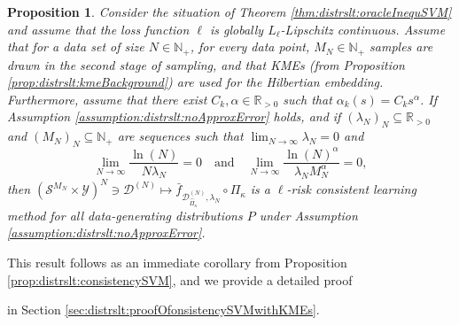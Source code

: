 \documentclass[letterpaper]{article} %
\newcommand{\R}{\mathbb{R}}
\newcommand{\Rp}{\R_{> 0}}
\newcommand{\Np}{\mathbb{N}_+}
\newcommand{\KME}[1]{\Pi_{#1}} %
\newcommand{\samplingSet}{\mathcal{S}} %
\newcommand{\outputSet}{\mathcal{Y}} %
\newcommand{\dataSet}{\mathcal{D}}
\newcommand{\kKME}{\kappa} %
\newcommand{\KMEk}{\KME{\kKME}} %
\newcommand{\KMEhat}{\hat{\Pi}_\kKME} %
\newcommand{\clipped}[1]{\bar{#1}}
\newtheorem{proposition}[theorem]{Proposition}
\newif\ifCameraReady
\begin{document}
\begin{proposition} \label{prop:distrslt:consistencySVMwithKMEs}
Consider the situation of Theorem \ref{thm:distrslt:oracleInequSVM} and assume that the loss function $\ell$ is globally $L_\ell$-Lipschitz continuous.
Assume that for a data set of size $N\in\Np$, for every data point, $M_N\in\Np$ samples are drawn in the second stage of sampling, and that KMEs (from Proposition \ref{prop:distrslt:kmeBackground}) are used for the Hilbertian embedding.
Furthermore, assume that there exist $C_k,\alpha\in\Rp$ such that $\alpha_k(s)=C_k s^\alpha$.
If Assumption \ref{assumption:distrslt:noApproxError} holds, 
and if $(\lambda_N)_N\subseteq\Rp$ and $(M_N)_N\subseteq\Np$ are sequences such that $\lim_{N\rightarrow\infty} \lambda_N = 0$ and
\begin{equation}
    \lim_{N\rightarrow\infty} \frac{\ln(N)}{N\lambda_N} = 0
    \quad \text{and} \quad
    \lim_{N\rightarrow\infty}\frac{\ln(N)^\alpha}{\lambda_N M_N^\alpha} = 0,
\end{equation}
then $(\samplingSet^{M_N}\times \outputSet)^N \ni \dataSet^{(N)}\mapsto \clipped{f}_{\dataSet^{(N)}_{\KMEhat},\lambda_N} \circ \KMEk$
is a  $\ell$-risk consistent learning method for all data-generating distributions $P$ under Assumption \ref{assumption:distrslt:noApproxError}. 
\end{proposition}
This result follows as an immediate corollary from Proposition \ref{prop:distrslt:consistencySVM}, and we provide a detailed proof 
\ifCameraReady
in the supplementary material.
\else
in Section \ref{sec:distrslt:proofOfonsistencySVMwithKMEs}.
\fi
\end{document}
